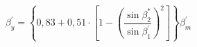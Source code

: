 
\(\)
\(\)
\(\)
\(\)

\[\beta_{y}^{\prime}=\left\{0,83+0,51 \cdot\left[1-\left(\frac{\sin \beta_{2}^{*}}{\sin \beta_{1}^{\prime}}\right)^{2}\right]\right\} \beta_{m}^{\prime}\]

